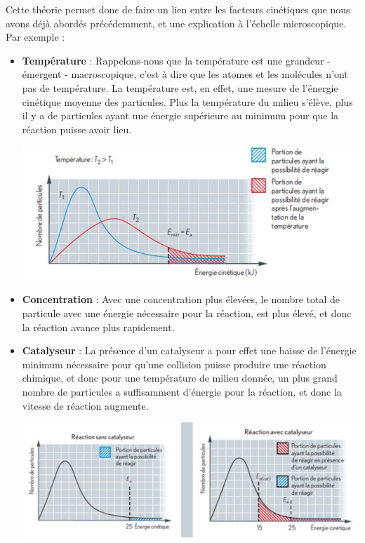 \documentclass[11pt,a4paper]{article}
\begin{document}
Cette théorie permet donc de faire un lien entre les facteurs cinétiques que nous avons déjà abordés précédemment, et une explication à l'échelle microscopique. 
Par exemple : 
\begin{itemize}
    \item \textbf{Température} : Rappelons-nous que la température est une grandeur - émergent - macroscopique, c'est à dire que les atomes et les molécules n'ont pas de température. La température est, en effet, une mesure de l'énergie cinétique moyenne des particules. Plus la température du milieu s'élève, plus il y a de particules ayant une énergie supérieure au minimum pour que la réaction puisse avoir lieu. 
    \begin{center}
        \includegraphics[width=\linewidth]{imgs/c4/energieactivate.jpg}
    \end{center}    
    \item \textbf{Concentration} : Avec une concentration plus élevées, le nombre total de particule avec une énergie nécessaire pour la réaction, est plus élevé, et donc la réaction avance plus rapidement. 
    \item \textbf{Catalyseur} : La présence d'un catalyseur a pour effet une baisse de l'énergie minimum nécessaire pour qu'une collision puisse produire une réaction chimique, et donc pour une température de milieu donnée, un plus grand nombre de particules a suffisamment d'énergie pour la réaction, et donc la vitesse de réaction augmente. 
    \begin{center}
        \includegraphics[width=0.9\linewidth]{imgs/c4/energiecatalyse.jpg}

\end{center}
\end{itemize}
\end{document}
